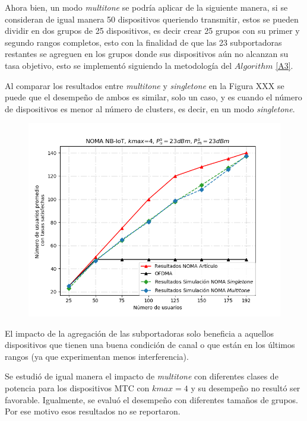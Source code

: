 Ahora bien, un modo \textit{multitone} se podría aplicar de la siguiente manera, si se consideran de igual manera 50 dispositivos queriendo transmitir, estos se pueden dividir en dos grupos de 25 dispositivos, es decir crear 25 grupos con su primer y segundo rangos completos, esto con la finalidad de que las 23 subportadoras restantes se agreguen en los grupos donde sus dispositivos aún no alcanzan su tasa objetivo, esto se implementó siguiendo la metodología del $Algorithm$ \ref{A3}. \newline

Al comparar los resultados entre \textit{multitone} y \textit{singletone} en la Figura XXX se puede que el desempeño de ambos es similar, solo un caso, y es cuando el número de dispositivos es menor al número de clusters, es decir, en un modo \textit{singletone}.\newline

\begin{figure}[th]
    \centering
    \includegraphics[scale=.7]{Figures/NOMA_results_comparation.png}
    \decoRule
    \caption[]{}
    \label{fig:ResultsNOMA}
\end{figure}

El impacto de la agregación de las subportadoras solo beneficia a aquellos dispositivos que tienen una buena condición de canal o que están en los últimos rangos (ya que experimentan menos interferencia). \newline

Se estudió de igual manera el impacto de \textit{multitone} con diferentes clases de potencia para los dispositivos MTC con $kmax = 4$ y su desempeño no resultó ser favorable. Igualmente, se evaluó el desempeño con diferentes tamaños de grupos. Por ese motivo esos resultados no se reportaron.\newline

